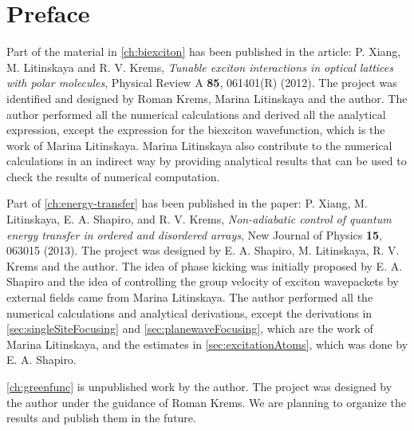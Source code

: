 
\chapter{Preface}

Part of the material in \autoref{ch:biexciton} has been published in the article: P. Xiang, M. Litinskaya and R. V. Krems, \textit{ Tunable exciton 
interactions in optical lattices with polar molecules}, Physical Review A {\bf 85}, 061401(R) (2012). The project was identified and 
designed by Roman Krems,  Marina Litinskaya and  the author. The author performed all the numerical calculations and
derived all the analytical expression, except the expression for the biexciton wavefunction, which is the work of Marina 
Litinskaya. Marina Litinskaya also contribute to the numerical calculations in an indirect way by providing analytical 
results that can be used to check the results of numerical computation. 

Part of \autoref{ch:energy-transfer} has been published in the paper: P. Xiang, M. Litinskaya, E. A. Shapiro, and R. V. Krems, 
 \textit{ Non-adiabatic control of quantum energy transfer in ordered and disordered arrays}, 
 New Journal of Physics {\bf 15}, 063015 (2013).  
The project was designed by E. A. Shapiro, M. Litinskaya, R. V. Krems and the author. The idea of phase kicking was initially
proposed by E. A. Shapiro and the idea of controlling the group velocity of exciton wavepackets by external fields came 
from Marina Litinskaya. The author performed all the numerical calculations and analytical derivations, except the 
derivations in \autoref{sec:singleSiteFocusing} and \autoref{sec:planewaveFocusing}, which are the work of Marina Litinskaya, and the estimates in \autoref{sec:excitationAtoms}, which was done by E. A. Shapiro. 

\autoref{ch:greenfunc} is unpublished work by the author. The project was designed by the author under the guidance of
Roman Krems. We are planning to organize the results and publish them in the future. 